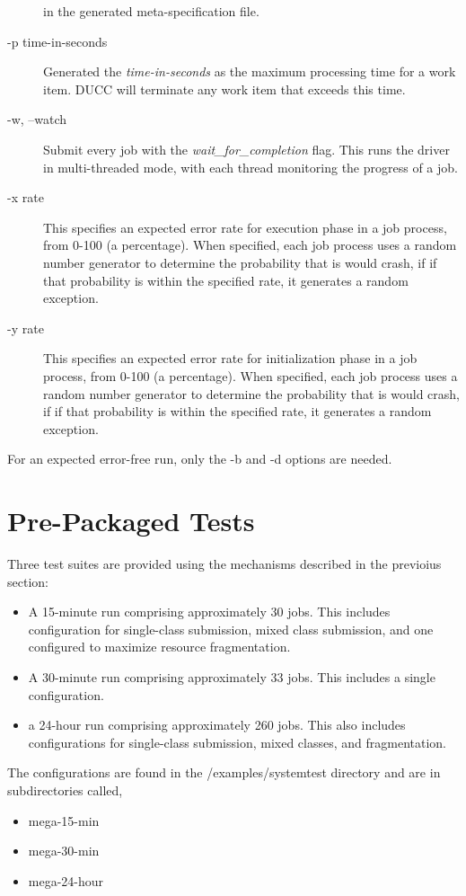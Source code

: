 \begin{description}
        in the generated meta-specification file.
      \item[-p time-in-seconds] Generated the {\em time-in-seconds} as the maximum processing time
        for a work item.  DUCC will terminate any work item that exceeds this time.
      \item[-w, --watch] Submit every job with the {\em wait\_for\_completion} flag. This runs the
        driver in multi-threaded mode, with each thread monitoring the progress of a job.
      \item[-x rate] This specifies an expected error rate for execution phase in a job process, from 0-100 (a
        percentage).  When specified, each job process uses a random number generator to determine
        the probability that is would crash, if if that probability is within the specified rate, it
        generates a random exception.
      \item[-y rate]  This specifies an expected error rate for initialization phase in a job process, from 0-100 (a
        percentage).  When specified, each job process uses a random number generator to determine
        the probability that is would crash, if if that probability is within the specified rate, it
        generates a random exception.
    \end{description}

    For an expected error-free run, only the -b and -d options are needed.

    
\section{Pre-Packaged Tests}
    Three test suites are provided using the mechanisms described in the previoius section:
    \begin{itemize}
      \item A 15-minute run comprising approximately 30 jobs.  This includes configuration for
        single-class submission, mixed class submission, and one configured to maximize
        resource fragmentation.
      \item A 30-minute run comprising approximately 33 jobs. This includes a single
        configuration.
      \item a 24-hour run comprising approximately 260 jobs.  This also includes configurations
        for single-class submission, mixed classes, and fragmentation.
    \end{itemize}

     The configurations are found in the \duccruntime/examples/systemtest directory
     and are in subdirectories called, 
     \begin{itemize}
       \item mega-15-min
       \item mega-30-min
       \item mega-24-hour
     \end{itemize}
     
